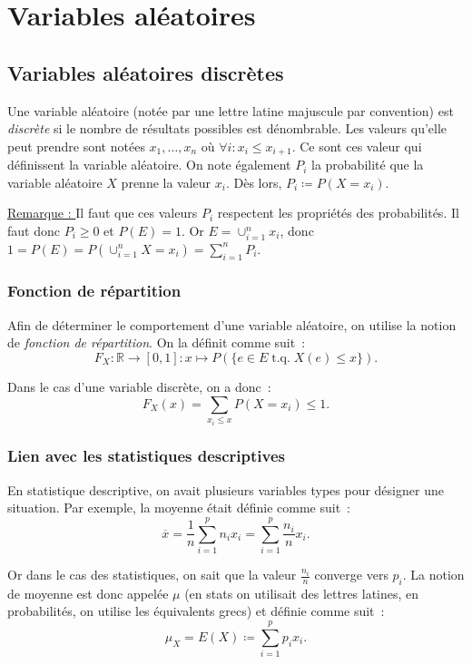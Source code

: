 \documentclass{article}
\DeclareMathOperator{\tq}{\text{ t.q. }}
\begin{document}
\section{Variables aléatoires}
	\subsection{Variables aléatoires discrètes}
		Une variable aléatoire (notée par une lettre latine majuscule par convention) est \textit{discrète} si le nombre de résultats possibles est dénombrable.
		Les valeurs qu'elle peut prendre sont notées $x_1, \ldots, x_n$ où $\forall i : x_i \leq x_{i+1}$. Ce sont ces valeur qui définissent la variable aléatoire.
		On note également $P_i$ la probabilité que la variable aléatoire $X$ prenne la valeur $x_i$. Dès lors, $P_i \coloneqq P(X = x_i)$.

		\underline{Remarque : } Il faut que ces valeurs $P_i$ respectent les propriétés des probabilités. Il faut donc $P_i \geq 0$ et $P(E) = 1$. Or
		$E = \cup_{i=1}^nx_i$, donc $1 = P(E) = P(\cup_{i=1}^nX=x_i) = \sum_{i=1}^nP_i$.

		\subsubsection{Fonction de répartition}
			Afin de déterminer le comportement d'une variable aléatoire, on utilise la notion de \textit{fonction de répartition}. On la définit comme suit~:
			\[F_X : \mathbb R \to [0, 1] : x \mapsto P(\{e \in E \tq X(e) \leq x\}).\]

			Dans le cas d'une variable discrète, on a donc~:
			\[F_X(x) = \sum_{x_i \leq x}P(X=x_i) \leq 1.\]

		\subsubsection{Lien avec les statistiques descriptives}
			En statistique descriptive, on avait plusieurs variables types pour désigner une situation. Par exemple, la moyenne était définie comme suit~:
			\[\overline x = \frac 1n\sum_{i=1}^pn_ix_i = \sum_{i=1}^p\frac {n_i}nx_i.\]

			Or dans le cas des statistiques, on sait que la valeur $\frac {n_i}n$ converge vers $p_i$. La notion de moyenne est donc appelée $\mu$ (en stats on utilisait
			des lettres latines, en probabilités, on utilise les équivalents grecs) et définie comme suit~:
			\[\mu_X = E(X) \coloneqq \sum_{i=1}^pp_ix_i.\]
\end{document}
